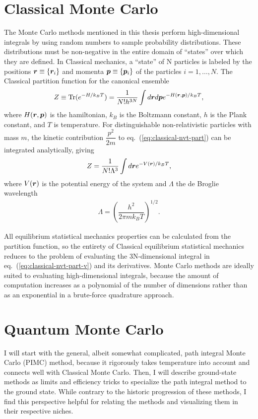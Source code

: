 \section{Classical Monte Carlo}
The Monte Carlo methods mentioned in this thesis perform high-dimensional integrals by using random numbers to sample probability distributions. These distributions must be non-negative in the entire domain of ``states'' over which they are defined. In Classical mechanics, a ``state'' of N particles is labeled by the positions $\boldsymbol{r}\equiv\{\boldsymbol{r}_i\}$ and momenta $\boldsymbol{p}\equiv\{\boldsymbol{p}_i\}$ of the particles $i=1,\dots,N$. The Classical partition function for the canonical ensemble
\begin{align} \label{eq:classical-nvt-part}
Z \equiv \text{Tr}(e^{-H/k_BT}) = \dfrac{1}{N!h^{3N}} \int d\boldsymbol{r} d\boldsymbol{p} e^{-H(\boldsymbol{r}, \boldsymbol{p})/k_BT},
\end{align}
where $H(\boldsymbol{r}, \boldsymbol{p})$ is the hamiltonian, $k_B$ is the Boltzmann constant, $h$ is the Plank constant, and $T$ is temperature. For distinguishable non-relativistic particles with mass $m$, the kinetic contribution $\dfrac{p^2}{2m}$ to eq.~(\ref{eq:classical-nvt-part}) can be integrated analytically, giving
\begin{align}\label{eq:classical-nvt-part-v}
Z = \dfrac{1}{N!\Lambda^{3}} \int d\boldsymbol{r} e^{-V(\boldsymbol{r})/k_BT},
\end{align}
where $V(\boldsymbol{r})$ is the potential energy of the system and $\Lambda$ the de Broglie wavelength
\begin{align} \label{eq:debroglie}
\Lambda = \left(
\dfrac{h^2}{2\pi mk_BT}
\right)^{1/2}.
\end{align}

All equilibrium statistical mechanics properties can be calculated from the partition function, so the entirety of Classical equilibrium statistical mechanics reduces to the problem of evaluating the 3N-dimensional integral in eq.~(\ref{eq:classical-nvt-part-v}) and its derivatives. Monte Carlo methods are ideally suited to evaluating high-dimensional integrals, because the amount of computation increases as a polynomial of the number of dimensions rather than as an exponential in a brute-force quadrature approach.

\section{Quantum Monte Carlo}

I will start with the general, albeit somewhat complicated, path integral Monte Carlo (PIMC) method, because it rigorously takes temperature into account and connects well with Classical Monte Carlo. Then, I will describe ground-state methods as limits and efficiency tricks to specialize the path integral method to the ground state. While contrary to the historic progression of these methods, I find this perspective helpful for relating the methods and visualizing them in their respective niches.

